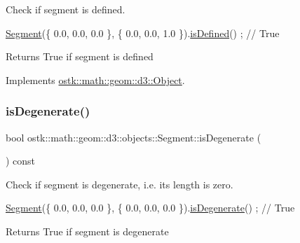 Check if segment is defined. 


\begin{DoxyCode}
\hyperlink{classostk_1_1math_1_1geom_1_1d3_1_1objects_1_1_segment_aa2cb60ce06335a5f76120c658219494c}{Segment}(\{ 0.0, 0.0, 0.0 \}, \{ 0.0, 0.0, 1.0 \}).\hyperlink{classostk_1_1math_1_1geom_1_1d3_1_1objects_1_1_segment_ab89a57a59d50bfd6fe609e92d158e6ec}{isDefined}() ; \textcolor{comment}{// True}
\end{DoxyCode}


\begin{DoxyReturn}{Returns}
True if segment is defined 
\end{DoxyReturn}


Implements \hyperlink{classostk_1_1math_1_1geom_1_1d3_1_1_object_a271a1964cd208be85ce9a0a429395ad8}{ostk\+::math\+::geom\+::d3\+::\+Object}.

\mbox{\label{classostk_1_1math_1_1geom_1_1d3_1_1objects_1_1_segment_a472767f407b4fa42ae6de7d48ccb60d0}} 
\subsubsection{\texorpdfstring{is\+Degenerate()}{isDegenerate()}}
{\footnotesize\ttfamily bool ostk\+::math\+::geom\+::d3\+::objects\+::\+Segment\+::is\+Degenerate (\begin{DoxyParamCaption}{ }\end{DoxyParamCaption}) const}



Check if segment is degenerate, i.\+e. its length is zero. 


\begin{DoxyCode}
\hyperlink{classostk_1_1math_1_1geom_1_1d3_1_1objects_1_1_segment_aa2cb60ce06335a5f76120c658219494c}{Segment}(\{ 0.0, 0.0, 0.0 \}, \{ 0.0, 0.0, 0.0 \}).\hyperlink{classostk_1_1math_1_1geom_1_1d3_1_1objects_1_1_segment_a472767f407b4fa42ae6de7d48ccb60d0}{isDegenerate}() ; \textcolor{comment}{// True}
\end{DoxyCode}


\begin{DoxyReturn}{Returns}
True if segment is degenerate 
\end{DoxyReturn}
\mbox{\label{classostk_1_1math_1_1geom_1_1d3_1_1objects_1_1_segment_a2239bed274a65f4e0f25147c15f343c7}} 

